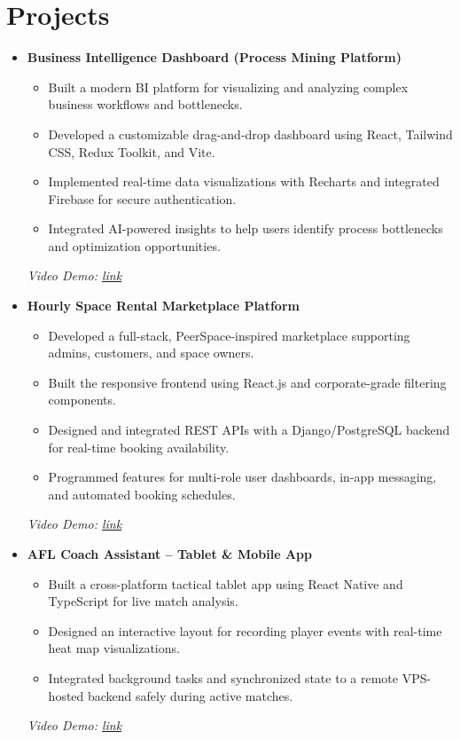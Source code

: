 \documentclass[a4paper,10pt]{article}
\begin{document}
\section*{Projects}
\vspace{2mm}
\begin{itemize}

    \item \textbf{Business Intelligence Dashboard (Process Mining Platform)}  
    \begin{itemize}
        \item Built a modern BI platform for visualizing and analyzing complex business workflows and bottlenecks.
        \item Developed a customizable drag-and-drop dashboard using React, Tailwind CSS, Redux Toolkit, and Vite.
        \item Implemented real-time data visualizations with Recharts and integrated Firebase for secure authentication.
        \item Integrated AI-powered insights to help users identify process bottlenecks and optimization opportunities.
    \end{itemize}
    \textit{Video Demo: \href{https://drive.google.com/file/d/1HgY7zspeZM05IgtBCi_PThGgUByWJ599/view?usp=sharing}{link}}

    \vspace{1mm}
    \item \textbf{Hourly Space Rental Marketplace Platform}
    \begin{itemize}
        \item Developed a full-stack, PeerSpace-inspired marketplace supporting admins, customers, and space owners.
        \item Built the responsive frontend using React.js and corporate-grade filtering components.
        \item Designed and integrated REST APIs with a Django/PostgreSQL backend for real-time booking availability.
        \item Programmed features for multi-role user dashboards, in-app messaging, and automated booking schedules.
    \end{itemize}
    \textit{Video Demo: \href{https://drive.google.com/file/d/1KX7-xiyxmOTFoC1EbAWWzMxdV-IhxIxa/view?usp=sharing}{link}}  
    
    \vspace{1mm}
    \item \textbf{AFL Coach Assistant – Tablet \& Mobile App}
    \begin{itemize}
        \item Built a cross-platform tactical tablet app using React Native and TypeScript for live match analysis.
        \item Designed an interactive layout for recording player events with real-time heat map visualizations.
        \item Integrated background tasks and synchronized state to a remote VPS-hosted backend safely during active matches.
    \end{itemize}
    \textit{Video Demo: \href{https://drive.google.com/file/d/1v73jetF5sXyiQpU8u3ogTizVDoL7hUzU/view?usp=sharing}{link}}


\end{itemize}
\end{document}
